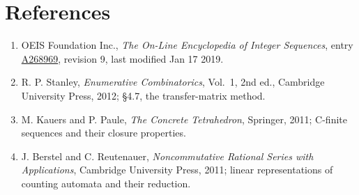 \documentclass[11pt]{article}
\theoremstyle{definition}
\begin{document}
\section{References}

\begin{enumerate}

\item OEIS Foundation Inc., \emph{The On-Line Encyclopedia of Integer Sequences}, entry \href{https://oeis.org/A268969}{A268969}, revision 9, last modified Jan 17 2019.

\item R. P. Stanley, \emph{Enumerative Combinatorics}, Vol.~1, 2nd ed., Cambridge University Press, 2012; \S4.7, the transfer-matrix method.

\item M. Kauers and P. Paule, \emph{The Concrete Tetrahedron}, Springer, 2011; C-finite sequences and their closure properties.

\item J. Berstel and C. Reutenauer, \emph{Noncommutative Rational Series with Applications}, Cambridge University Press, 2011; linear representations of counting automata and their reduction.

\end{enumerate}
\end{document}
